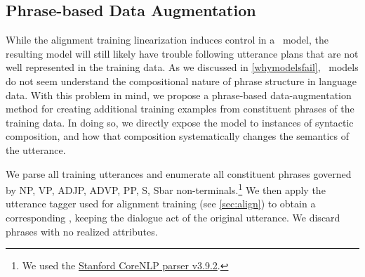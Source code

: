 \subsection{Phrase-based Data Augmentation}
\label{sec:pbda}



While the alignment training linearization induces control in a 
\sequencetosequence~model, the resulting model will still likely have trouble
following utterance plans that are not well represented in the training 
data. As we discussed in \autoref{whymodelsfail}, \sequencetosequence~models
do not seem understand the compositional nature of phrase structure
in language data. With this problem in mind, we propose a 
phrase-based data-augmentation method for creating additional training examples
from constituent phrases of the training data. In doing so, we directly
expose the model to instances of syntactic composition, and how that composition systematically changes the semantics of the utterance.


We parse all training utterances and enumerate all constituent phrases
governed by 
NP, VP, ADJP, ADVP, PP, S, Sbar
non-terminals.\footnote{We used the \href{https://stanfordnlp.github.io/CoreNLP/}{Stanford CoreNLP parser v3.9.2}.} We then apply the utterance tagger
used for alignment training (see \autoref{sec:align})
to obtain a corresponding \meaningrepresentation, keeping the dialogue act 
of the original utterance. We discard
phrases with no realized attributes.

